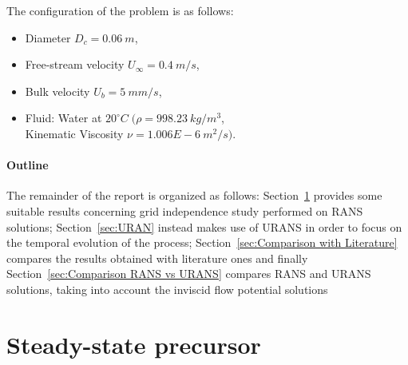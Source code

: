 \documentclass[12pt]{article}
\begin{document}
        The configuration of the problem is as follows:
        \begin{itemize}
                \item Diameter \( D_c = 0.06 \: m \),
                \item Free-stream velocity \( U_\infty = 0.4 \: m/s \),
                \item Bulk velocity \( U_b = 5 \: mm/s \),
                \item Fluid: Water at \( 20^{\circ}C \; ( \rho = 998.23 \: kg/m^3\), \\ Kinematic Viscosity \( \nu = 1.006E-6 \: m^2/s ) \).
        \end{itemize}


        \paragraph{Outline}
        The remainder of the report is organized as follows: Section~\ref{sec:Steady-state precursor} provides some suitable results concerning grid independence study performed on RANS solutions; Section~\ref{sec:URAN} instead makes use of URANS in order to focus on the temporal evolution  of the process; Section~\ref{sec:Comparison with Literature} compares the results obtained with literature ones and finally  Section~\ref{sec:Comparison RANS vs URANS} compares RANS and URANS solutions, taking into account the inviscid flow potential solutions
        
      
      
\section{Steady-state precursor} \label{sec:Steady-state precursor}
\end{document}
